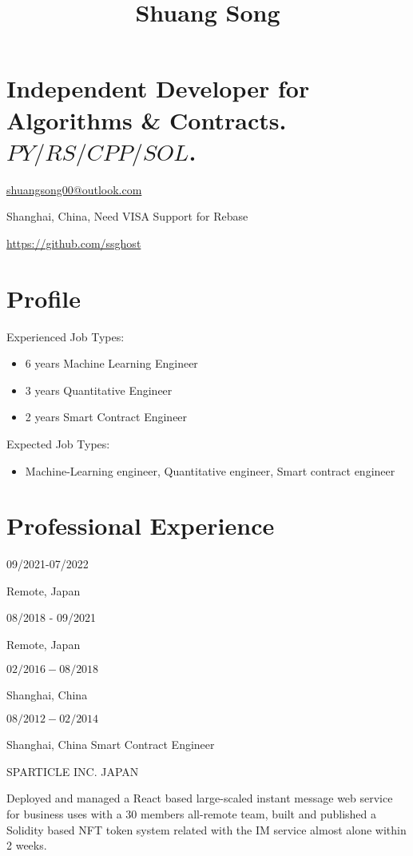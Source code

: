 \documentclass[10pt]{article}
\title{Shuang Song }
\author{}
\date{}
\begin{document}
\maketitle
\section{Independent Developer for Algorithms \& Contracts. 
 $P Y / R S / C P P / S O L$.}
\href{mailto:shuangsong00@outlook.com}{shuangsong00@outlook.com}

Shanghai, China, Need VISA Support for Rebase

\href{https://github.com/ssghost}{https://github.com/ssghost}

\section{Profile}
Experienced Job Types:

\begin{itemize}
  \item 6 years Machine Learning Engineer
  
  \item 3 years Quantitative Engineer

  \item 2 years Smart Contract Engineer

\end{itemize}

Expected Job Types:

\begin{itemize}
  \item Machine-Learning engineer, Quantitative engineer, Smart contract engineer
\end{itemize}

\section{Professional Experience}
09/2021-07/2022

Remote, Japan

08/2018 - 09/2021

Remote, Japan

$02 / 2016-08 / 2018$

Shanghai, China

$08 / 2012-02 / 2014$

Shanghai, China Smart Contract Engineer

SPARTICLE INC. JAPAN

Deployed and managed a React based large-scaled instant message web service for business uses with a 30 members all-remote team, built and published a Solidity based NFT token system related with the IM service almost alone within 2 weeks.
\end{document}
